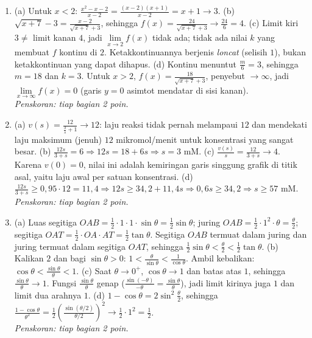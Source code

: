 \documentclass[a4paper,11pt]{article}
\newcounter{no}
\begin{document}
\par{}\par\vspace{0.2em}
\small\begin{enumerate}[leftmargin=2em,itemsep=3pt,topsep=2pt]
\item[\textbf{1.}] (a) Untuk $x<2$: $\frac{x^2-x-2}{x-2}=\frac{(x-2)(x+1)}{x-2}=x+1\to3$. (b) $\sqrt{x+7}-3=\frac{x-2}{\sqrt{x+7}+3}$, sehingga $f(x)=\frac{24}{\sqrt{x+7}+3}\to\frac{24}{6}=4$. (c) Limit kiri $3\ne$ limit kanan $4$, jadi $\lim\limits_{x\to2}f(x)$ tidak ada; tidak ada nilai $k$ yang membuat $f$ kontinu di $2$. Ketakkontinuannya berjenis \emph{loncat} (selisih $1$), bukan ketakkontinuan yang dapat dihapus. (d) Kontinu menuntut $\frac m6=3$, sehingga $m=18$ dan $k=3$. Untuk $x>2$, $f(x)=\frac{18}{\sqrt{x+7}+3}$, penyebut $\to\infty$, jadi $\lim\limits_{x\to\infty}f(x)=0$ (garis $y=0$ asimtot mendatar di sisi kanan). \\ \textit{Penskoran: tiap bagian 2 poin.}
\item[\textbf{2.}] (a) $v(s)=\frac{12}{\frac3s+1}\to12$: laju reaksi tidak pernah melampaui $12$ dan mendekati laju maksimum (jenuh) $12$ mikromol/menit untuk konsentrasi yang sangat besar. (b) $\frac{12s}{3+s}=6\Rightarrow12s=18+6s\Rightarrow s=3$ mM. (c) $\frac{v(s)}{s}=\frac{12}{3+s}\to4$. Karena $v(0)=0$, nilai ini adalah kemiringan garis singgung grafik di titik asal, yaitu laju awal per satuan konsentrasi. (d) $\frac{12s}{3+s}\ge0{,}95\cdot12=11{,}4\Rightarrow12s\ge34{,}2+11{,}4s\Rightarrow0{,}6s\ge34{,}2\Rightarrow s\ge57$ mM. \\ \textit{Penskoran: tiap bagian 2 poin.}
\item[\textbf{3.}] (a) Luas segitiga $OAB=\frac12\cdot1\cdot1\cdot\sin\theta=\frac12\sin\theta$; juring $OAB=\frac12\cdot1^2\cdot\theta=\frac\theta2$; segitiga $OAT=\frac12\cdot OA\cdot AT=\frac12\tan\theta$. Segitiga $OAB$ termuat dalam juring dan juring termuat dalam segitiga $OAT$, sehingga $\frac12\sin\theta<\frac\theta2<\frac12\tan\theta$. (b) Kalikan $2$ dan bagi $\sin\theta>0$: $1<\frac\theta{\sin\theta}<\frac1{\cos\theta}$. Ambil kebalikan: $\cos\theta<\frac{\sin\theta}\theta<1$. (c) Saat $\theta\to0^+$, $\cos\theta\to1$ dan batas atas $1$, sehingga $\frac{\sin\theta}\theta\to1$. Fungsi $\frac{\sin\theta}{\theta}$ genap ($\frac{\sin(-\theta)}{-\theta}=\frac{\sin\theta}{\theta}$), jadi limit kirinya juga $1$ dan limit dua arahnya $1$. (d) $1-\cos\theta=2\sin^2\frac\theta2$, sehingga $\frac{1-\cos\theta}{\theta^2}=\frac12\left(\frac{\sin(\theta/2)}{\theta/2}\right)^2\to\frac12\cdot1^2=\frac12$. \\ \textit{Penskoran: tiap bagian 2 poin.}

\end{enumerate}
\end{document}
